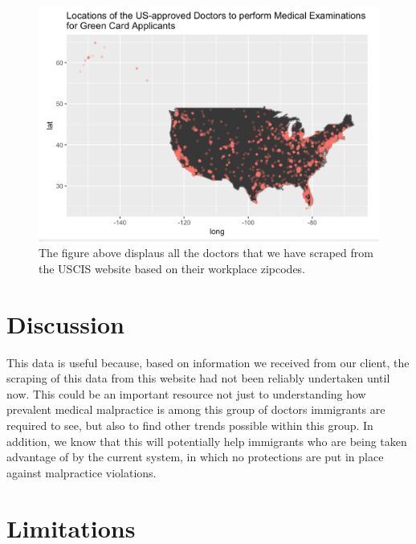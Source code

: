 \documentclass[10pt,letterpaper]{article}
\begin{document}
\begin{figure}
\includegraphics[width=1\linewidth]{ResultsMap} \caption{The figure above displaus all the doctors that we have scraped from the USCIS website based on their workplace zipcodes.}\label{fig:unnamed-chunk-5}
\end{figure}

\section{Discussion}\label{discussion}

This data is useful because, based on information we received from our
client, the scraping of this data from this website had not been
reliably undertaken until now. This could be an important resource not
just to understanding how prevalent medical malpractice is among this
group of doctors immigrants are required to see, but also to find other
trends possible within this group. In addition, we know that this will
potentially help immigrants who are being taken advantage of by the
current system, in which no protections are put in place against
malpractice violations.

\section{Limitations}\label{limitations}
\end{document}
